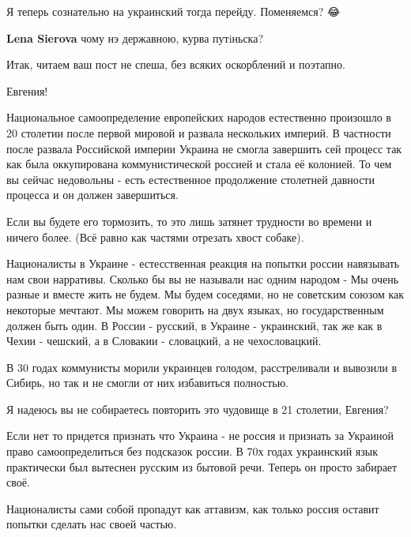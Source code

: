 \begin{itemize}

Я теперь сознательно на украинский тогда перейду. Поменяемся? 😂

\begin{itemize}

\textbf{Lena Sierova} чому нэ державною, курва путiньска?
\end{itemize}


Итак, читаем ваш пост не спеша, без всяких оскорблений и поэтапно.

Евгения!

Национальное самоопределение европейских народов естественно произошло в 20
столетии после первой мировой и развала нескольких империй. В частности после
развала Российской империи Украина не смогла завершить сей процесс так как была
оккупирована коммунистической россией и стала её колонией. То чем вы сейчас
недовольны - есть естественное продолжение столетней давности процесса и он
должен завершиться.

Если вы будете его тормозить, то это лишь затянет трудности во времени и ничего более. (Всё равно как частями отрезать хвост собаке).

Националисты в Украине - естесственная реакция на попытки россии навязывать нам
свои нарративы. Сколько бы вы не называли нас одним народом - Мы очень разные и
вместе жить не будем. Мы будем соседями, но не советским союзом как некоторые
мечтают. Мы можем говорить на двух языках, но государственным должен быть один.
В России - русский, в Украине - украинский, так же как в Чехии - чешский, а в
Словакии - словацкий, а не чехословацкий.

В 30 годах коммунисты морили украинцев голодом, расстреливали и вывозили в
Сибирь, но так и не смогли от них избавиться полностью.

Я надеюсь вы не собираетесь повторить это чудовище в 21 столетии, Евгения?

Если нет то придется признать что Украина - не россия и признать за Украиной
право самоопределиться без подсказок россии. В 70х годах украинский язык
практически был вытеснен русским из бытовой речи. Теперь он просто забирает
своё.

Националисты сами собой пропадут как аттавизм, как только россия оставит
попытки сделать нас своей частью.


\end{itemize}
